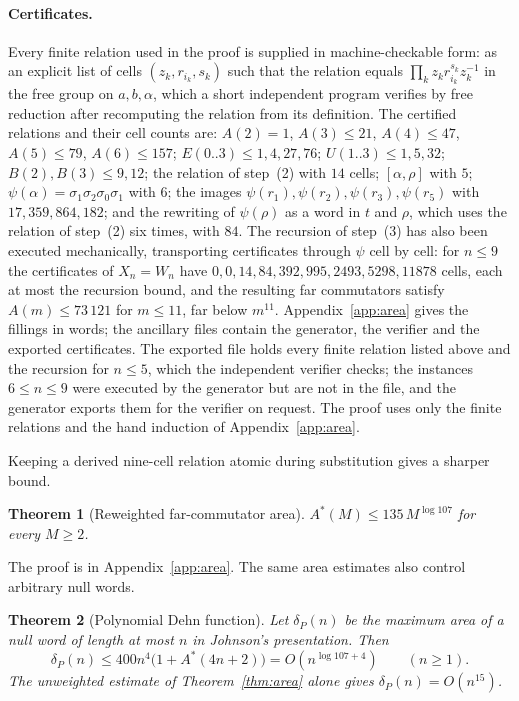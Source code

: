 \documentclass[11pt,a4paper]{article}
\theoremstyle{plain}
\newtheorem{theorem}{Theorem}[section]
\theoremstyle{definition}
\theoremstyle{remark}
\begin{document}
\paragraph{Certificates.} Every finite relation used in the proof is supplied in machine-checkable form: as an
explicit list of cells $(z_k,r_{i_k},s_k)$ such that the relation equals $\prod_kz_kr_{i_k}^{s_k}z_k^{-1}$ in the free
group on $a,b,\alpha$, which a short independent program verifies by free reduction after recomputing the relation
from its definition. The certified relations and their cell counts are: $A(2)=1$, $A(3)\le21$, $A(4)\le47$,
$A(5)\le79$, $A(6)\le157$; $E(0..3)\le1,4,27,76$; $U(1..3)\le1,5,32$; $B(2),B(3)\le9,12$; the relation of step~(2)
with $14$ cells; $[\alpha,\rho]$ with $5$; $\psi(\alpha)=\sigma_1\sigma_2\sigma_0\sigma_1$ with $6$; the images
$\psi(r_1),\psi(r_2),\psi(r_3),\psi(r_5)$ with $17,359,864,182$; and the rewriting of $\psi(\rho)$ as a word in
$t$ and $\rho$, which uses the relation of step~(2) six times, with $84$. The recursion of step~(3) has also been executed mechanically, transporting certificates through
$\psi$ cell by cell: for $n\le9$ the certificates of $X_n=W_n$ have $0,0,14,84,392,995,2493,5298,11878$ cells, each at
most the recursion bound, and the resulting far commutators satisfy $A(m)\le73\,121$ for $m\le11$, far below $m^{11}$.
Appendix~\ref{app:area} gives the fillings in words; the ancillary files contain the generator, the verifier and the
exported certificates. The exported file holds every finite relation listed above and the recursion for $n\le5$, which the
independent verifier checks; the instances $6\le n\le9$ were executed by the generator but are not in the file, and the generator
exports them for the verifier on request. The proof uses only the finite relations and the hand induction of Appendix~\ref{app:area}.

Keeping a derived nine-cell relation atomic during substitution gives a sharper bound.

\begin{theorem}[Reweighted far-commutator area]\label{thm:area-weighted}
$A^*(M)\le135\,M^{\log107}$ for every $M\ge2$.
\end{theorem}

The proof is in Appendix~\ref{app:area}. The same area estimates also control arbitrary null words.

\begin{theorem}[Polynomial Dehn function]\label{thm:dehn}
Let $\delta_P(n)$ be the maximum area of a null word of length at most $n$ in Johnson's presentation. Then
\[
\delta_P(n)\le 400n^4\bigl(1+A^*(4n+2)\bigr)
=O(n^{\log107+4})\qquad(n\ge1).
\]
The unweighted estimate of Theorem~\ref{thm:area} alone gives $\delta_P(n)=O(n^{15})$.
\end{theorem}
\end{document}
